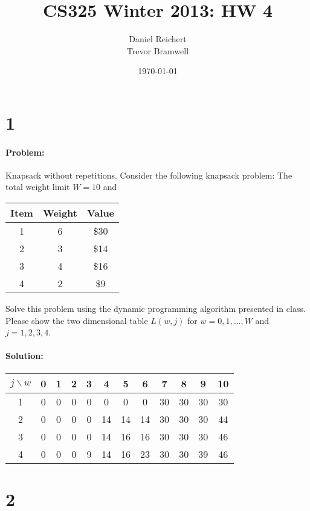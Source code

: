 \documentclass[12pt]{article}
\title{CS325 Winter 2013: HW 4}
\author{
    Daniel Reichert \\
    Trevor Bramwell \\
}
\date{\today}
\begin{document}
\maketitle
\section*{1}
\paragraph{Problem:}
Knapsack without repetitions. Consider the following knapsack problem:
The total weight limit $W = 10$ and
\begin{center}
\begin{tabular}{ c | c | c }
    Item & Weight & Value \\ \hline
    1 & 6 & \$30 \\
    2 & 3 & \$14 \\
    3 & 4 & \$16 \\
    4 & 2 & \$9  \\ \hline
\end{tabular}
\end{center}
Solve this problem using the dynamic programming algorithm presented in class. Please show the two
dimensional table $L(w, j)$ for $w = 0, 1, \dots, W$ and $j = 1, 2, 3, 4$.

\paragraph{Solution:}
\begin{center}
\begin{tabular}{ c || c | c | c | c | c | c | c | c | c | c | c }
  $j \backslash w$ & 0 & 1 & 2 & 3 & 4 & 5 & 6 & 7 & 8 & 9 & 10 \\ \hline \hline
  1 & 0 & 0 & 0 & 0 & 0 & 0 & 0 & 30 & 30 & 30 & 30 \\ \hline
  2 & 0 & 0 & 0 & 0 & 14 & 14 & 14 & 30 & 30 & 30 & 44 \\ \hline
  3 & 0 & 0 & 0 & 0 & 14 & 16 & 16 & 30 & 30 & 30 & 46 \\ \hline
  4 & 0 & 0 & 0 & 9 & 14 & 16 & 23 & 30 & 30 & 39 & 46 \\ \hline
\end{tabular}
\end{center}

\section*{2}
\end{document}
